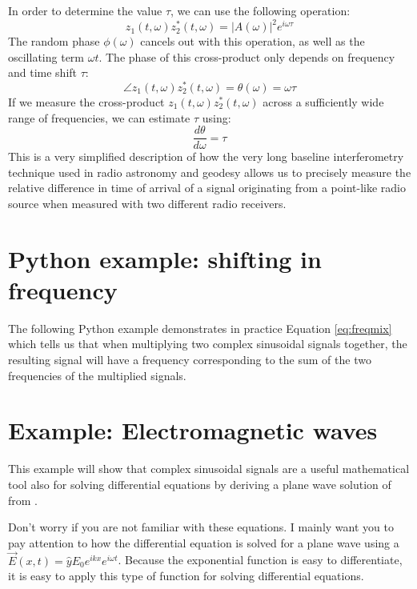 In order to determine the value $\tau$, we can use the following operation:
\begin{equation}
  z_1(t,\omega)z_2^*(t,\omega) = |A(\omega)|^2 e^{i\omega \tau}
\end{equation}
The random phase $\phi(\omega)$ cancels out with this operation, as well as the oscillating
term $\omega t$. The phase of this cross-product only depends on frequency and time shift $\tau$:
\begin{equation}
  \angle z_1(t,\omega)z_2^*(t,\omega) = \theta(\omega)= \omega \tau
\end{equation}
If we measure the cross-product $z_1(t,\omega)z_2^*(t,\omega)$ across a sufficiently
wide range of frequencies, we can estimate $\tau$ using:
\begin{equation}
  \frac{d\theta}{d\omega}= \tau
\end{equation}
This is a very simplified description of how the very long baseline interferometry
technique used in radio astronomy and geodesy allows us to precisely measure the
relative difference in time of arrival of a signal originating from a point-like
radio source when measured with two different radio receivers.


\section{Python example: shifting in frequency}

The following Python example demonstrates in practice
Equation \ref{eq:freqmix} which tells us that when multiplying two
complex sinusoidal signals together, the resulting signal will have a frequency corresponding to the sum of the two frequencies of the multiplied signals.



\section{Example: Electromagnetic waves}
\label{waveeq}

This example will show that complex sinusoidal signals are a useful
mathematical tool also for solving differential equations by deriving a
plane wave solution of  from .

Don't worry if you are not familiar with these equations. I mainly want you to pay attention to
how the differential equation is solved for a plane wave using a
$\vec{E}(x,t)=\hat{y}E_0 e^{i k x}e^{i\omega t}$. Because the exponential function is easy to differentiate,
it is easy to apply this type of function for solving differential equations.

